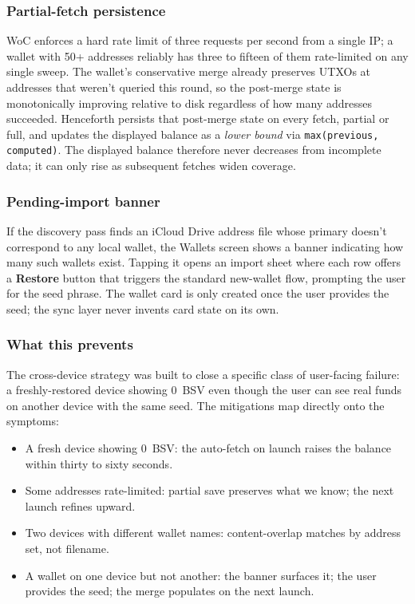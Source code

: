 \documentclass[a4paper, 11pt, openany]{book}
\begin{document}
\subsubsection*{Partial-fetch persistence}

WoC enforces a hard rate limit of three requests per second from a single IP; a wallet with 50+ addresses reliably has three to fifteen of them rate-limited on any single sweep. The wallet's conservative merge already preserves UTXOs at addresses that weren't queried this round, so the post-merge state is monotonically improving relative to disk regardless of how many addresses succeeded. Henceforth persists that post-merge state on every fetch, partial or full, and updates the displayed balance as a \emph{lower bound} via \texttt{max(previous, computed)}. The displayed balance therefore never decreases from incomplete data; it can only rise as subsequent fetches widen coverage.

\subsubsection*{Pending-import banner}

If the discovery pass finds an iCloud Drive address file whose primary doesn't correspond to any local wallet, the Wallets screen shows a banner indicating how many such wallets exist. Tapping it opens an import sheet where each row offers a \textbf{Restore} button that triggers the standard new-wallet flow, prompting the user for the seed phrase. The wallet card is only created once the user provides the seed; the sync layer never invents card state on its own.

\subsubsection*{What this prevents}

The cross-device strategy was built to close a specific class of user-facing failure: a freshly-restored device showing 0~BSV even though the user can see real funds on another device with the same seed. The mitigations map directly onto the symptoms:

\begin{itemize}
\item A fresh device showing 0~BSV: the auto-fetch on launch raises the balance within thirty to sixty seconds.
\item Some addresses rate-limited: partial save preserves what we know; the next launch refines upward.
\item Two devices with different wallet names: content-overlap matches by address set, not filename.
\item A wallet on one device but not another: the banner surfaces it; the user provides the seed; the merge populates on the next launch.
\end{itemize}
\end{document}
